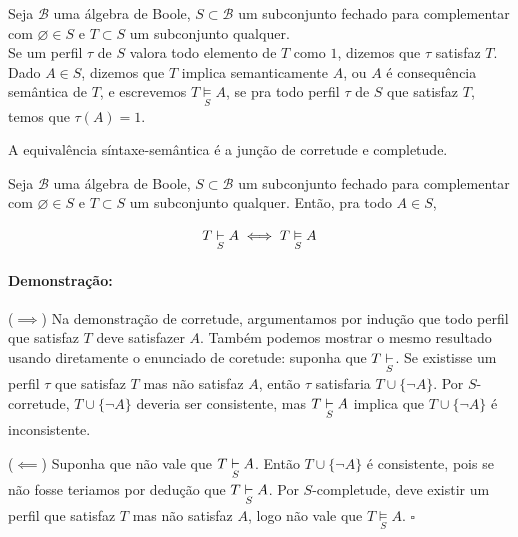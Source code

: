 \documentclass[11pt]{article}
\newcommand{\pulinho}{\vspace{.5cm}}
\theoremstyle{definition}
\theoremstyle{definition}
\theoremstyle{definition}
\theoremstyle{definition}
\newtheorem*{prop*}{Proposição}
\newenvironment{proposicao*}{
\definecolor{shadecolor}{HTML}{FFDBDF}
\begin{shaded}
\begin{prop*}
}
{
\end{prop*}
\end{shaded}
}
\theoremstyle{definition}
\theoremstyle{definition}
\theoremstyle{definition}
\theoremstyle{definition}
\newtheorem*{definition*}{Definição}
\newenvironment{definicao*}{
\definecolor{shadecolor}{HTML}{defcfc}
\begin{shaded}
\begin{definition*}
}
{
\end{definition*}
\end{shaded}
}
\theoremstyle{definition}
\theoremstyle{definition}
\newtheorem*{example*}{Exemplo}
\newenvironment{exemplo*}{
\definecolor{shadecolor}{HTML}{b9e6d3}
\begin{shaded}
\begin{example*}
}
{
\end{example*}
\end{shaded}
}
\theoremstyle{definition}
\theoremstyle{definition}
\newenvironment{prova}{\paragraph{Demonstração:}}{\hfill$\square$ 
\pulinho
}
\theoremstyle{definition}
\theoremstyle{definition}
\begin{document}
\newcommand{\Simplies}[1]{\underset{#1}{\vDash}}

\begin{definicao*}
Seja $\mathcal{B}$ uma álgebra de Boole, $S \subset \mathcal{B}$ um subconjunto fechado para complementar com $\varnothing \in S$ e $T \subset S$ um subconjunto qualquer.\\

Se um perfil $\tau$ de $S$ valora todo elemento de $T$ como $1$, dizemos que $\tau$ satisfaz $T$.\\


Dado $A \in S$, dizemos que $T$ implica semanticamente $A$, ou $A$ é consequência semântica de $T$, e escrevemos $T \Simplies{S} A$, se pra todo perfil $\tau$ de $S$ que satisfaz $T$, temos que $\tau(A) = 1$.
\end{definicao*}

A equivalência síntaxe-semântica é a junção de corretude e completude.

\begin{proposicao*}
  Seja $\mathcal{B}$ uma álgebra de Boole, $S \subset \mathcal{B}$ um subconjunto fechado para complementar com $\varnothing \in S$ e $T \subset S$ um subconjunto qualquer. Então, pra todo $A \in S$,

       \[T \Sproves{S} A \iff T \Simplies{S} A \]
\end{proposicao*}
\begin{prova}
($\implies$) Na demonstração de corretude, argumentamos por indução que todo perfil que satisfaz $T$ deve satisfazer $A$. Também podemos mostrar o mesmo resultado usando diretamente o enunciado de coretude: suponha que $T \underset{S}{\vdash}$. Se existisse um perfil $\tau$ que satisfaz $T$ mas não satisfaz $A$, então $\tau$ satisfaria $T \cup \{\lnot A\}$. Por $S$-corretude, $T \cup \{\lnot A\}$ deveria ser consistente, mas $T \underset{S}{\vdash} A$ implica que $T \cup \{\lnot A\}$ é inconsistente.

($\impliedby$) Suponha que não vale que $T \underset{S}{\vdash} A$. Então $T \cup \{\lnot A\}$ é consistente, pois se não fosse teriamos por dedução que $T \underset{S}{\vdash} A$. Por $S$-completude, deve existir um perfil que satisfaz $T$ mas não satisfaz $A$, logo não vale que $T \Simplies{S} A$.
\end{prova}


\end{document}
